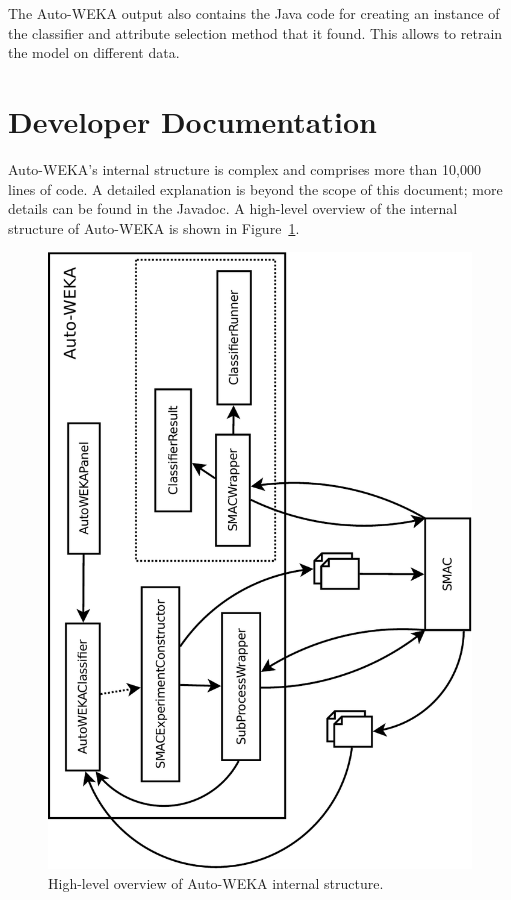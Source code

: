 \documentclass{article}
\begin{document}
The Auto-WEKA output also contains the Java code for creating an instance of the
classifier and attribute selection method that it found. This allows to retrain
the model on different data.

\section{Developer Documentation}

Auto-WEKA's internal structure is complex and comprises more than 10,000
lines of code. A detailed explanation is beyond the scope of this document; more
details can be found in the Javadoc. A high-level overview of the internal
structure of Auto-WEKA is shown in Figure~\ref{fig:devel-overview}.

\begin{figure}[!ht]
\begin{center}
\includegraphics[angle=-90,width=\textwidth]{devel-overview-crop}
\caption{High-level overview of Auto-WEKA internal structure.}
\label{fig:devel-overview}
\end{center}
\end{figure}
\end{document}
